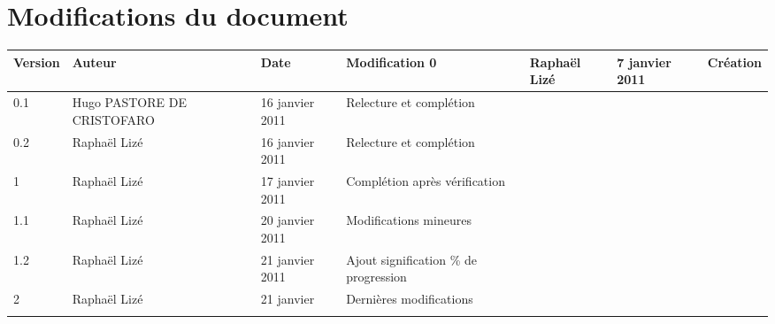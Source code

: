 
\section*{Modifications du document}

\begin{center}
\begin{longtable}{|m{14mm}|m{36mm}|m{36mm}|m{60mm}|}
\hline
Version & Auteur & Date & Modification\endhead \hline
0
& %
Raphaël Lizé
& %
7 janvier 2011
& %
Création
\\\hline
0.1
& %
Hugo PASTORE DE CRISTOFARO
& %
16 janvier 2011
& %
Relecture et complétion
\\\hline
0.2
& %
Raphaël Lizé
& %
16 janvier 2011
& %
Relecture et complétion
\\\hline
1
& %
Raphaël Lizé
& %
17 janvier 2011
& %
Complétion après vérification
\\\hline
1.1
& %
Raphaël Lizé
& %
20 janvier 2011
& %
Modifications mineures
\\\hline
1.2
& %
Raphaël Lizé
& %
21 janvier 2011
& %
Ajout signification \% de progression
\\\hline
2
& %
Raphaël Lizé
& %
21 janvier
& %
Dernières modifications
\\\hline

& %

& %

& %

\\\hline
\end{longtable}
\end{center}

